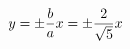 \documentclass[preview]{standalone}
\begin{document}
\begin{align*}
\special{dvisvgm:raw <g id='unique000'>}y=\pm \frac{b}{a}x = \pm \frac{2}{\sqrt{5}}x\special{dvisvgm:raw </g>}
\end{align*}
\end{document}
